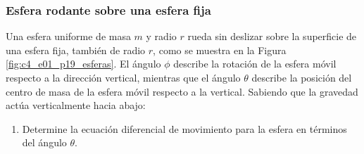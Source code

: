 \subsubsection{Esfera rodante sobre una esfera fija}

Una esfera uniforme de masa $m$ y radio $r$ rueda sin deslizar sobre la superficie de una esfera fija, también de radio $r$, como se muestra en la Figura \ref{fig:c4_e01_p19_esferas}. El ángulo $\phi$ describe la rotación de la esfera móvil respecto a la dirección vertical, mientras que el ángulo $\theta$ describe la posición del centro de masa de la esfera móvil respecto a la vertical. Sabiendo que la gravedad actúa verticalmente hacia abajo:

\begin{enumerate}
    \item Determine la ecuación diferencial de movimiento para la esfera en términos del ángulo $\theta$.
\end{enumerate}

